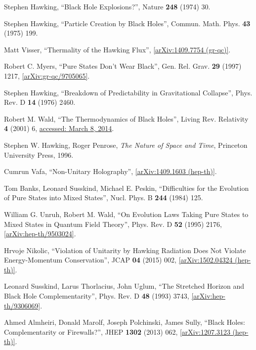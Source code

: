 \documentclass[12pt]{article}
\newcommand{\2}{$^2$}
\newcommand{\3}{$^3$}
\newcommand{\4}{$_4$}
\newcommand{\5}{$_5$}
\begin{document}
\begin{thebibliography}{400}
\raggedright

Stephen Hawking, ``Black Hole Explosions?'', Nature \textbf{248} (1974) 30.

Stephen Hawking, ``Particle Creation by Black Holes'', Commun. Math. Phys. \textbf{43} (1975) 199.

Matt Visser, ``Thermality of the Hawking Flux'', \href{http://arxiv.org/abs/1409.7754}{[arXiv:1409.7754 (gr-qc)]}.

Robert C. Myers, ``Pure States Don't Wear Black'', Gen. Rel. Grav. \textbf{29} (1997) 1217, \href{http://arxiv.org/abs/gr-qc/9705065}{[arXiv:gr-qc/9705065]}.

Stephen Hawking, ``Breakdown of Predictability in Gravitational Collapse'', Phys. Rev. D \textbf{14} (1976) 2460.


Robert M. Wald, ``The Thermodynamics of Black Holes'', 
Living Rev. Relativity \textbf{4} (2001) 6, \href{http://www.livingreviews.org/lrr-2001-6}{accessed: March 8, 2014}.

Stephen W. Hawking, Roger Penrose, \emph{The Nature of Space and Time}, Princeton University Press, 1996. 

Cumrun Vafa, ``Non-Unitary Holography'', \href{http://arxiv.org/abs/1409.1603}{[arXiv:1409.1603 (hep-th)]}.


Tom Banks, Leonard Susskind, Michael E. Peskin, ``Difficulties for the Evolution of Pure States into Mixed States'', Nucl. Phys. B \textbf{244} (1984) 125. 

William G. Unruh, Robert M. Wald, 
``On Evolution Laws Taking Pure States to Mixed States in Quantum Field Theory'',
Phys. Rev. D \textbf{52} (1995) 2176, \href{http://arxiv.org/abs/hep-th/9503024}{[arXiv:hep-th/9503024]}.

Hrvoje Nikolic, ``Violation of Unitarity by Hawking Radiation Does Not Violate Energy-Momentum Conservation'', JCAP \textbf{04} (2015) 002, \href{http://arxiv.org/abs/1502.04324}{[arXiv:1502.04324 (hep-th)]}.

Leonard Susskind, Larus Thorlacius, John Uglum, ``The Stretched Horizon and Black
Hole Complementarity'', Phys. Rev. D \textbf{48} (1993) 3743, \href{http://arxiv.org/abs/hep-th/9306069}{[arXiv:hep-th/9306069]}.

Ahmed Almheiri, Donald Marolf, Joseph Polchinski, James Sully, ``Black Holes: Complementarity or Firewalls?'', JHEP \textbf{1302} (2013) 062, \href{http://arxiv.org/abs/1207.3123}{[arXiv:1207.3123 (hep-th)]}.


\end{thebibliography}
\end{document}
